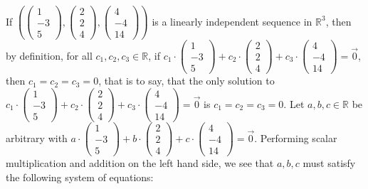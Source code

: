 \documentclass[12pt]{article}
\newenvironment{problem}[2][Problem]
{
	\begin{trivlist} 
		\item[\hskip \labelsep {\bfseries #1 #2:}]
	}
{
	\end{trivlist}
	}
\newenvironment{solution}[1][Solution]
{
	\begin{trivlist} 
		\item[\hskip \labelsep {\itshape #1:}]
	}
	{
	\end{trivlist}
}
\begin{document}
\begin{problem}{1}
\begin{solution}
If $\left(\begin{pmatrix}1\\-3\\5\end{pmatrix}, \begin{pmatrix}2\\2\\4\end{pmatrix}, \begin{pmatrix}4\\-4\\14\end{pmatrix}\right)$ is a linearly independent sequence in $\mathbb{R}^3$, then by definition, for all $c_1,c_2,c_3 \in \mathbb{R}$, if $c_1\cdot\begin{pmatrix}1\\-3\\5\end{pmatrix}+c_2\cdot \begin{pmatrix}2\\2\\4\end{pmatrix}+c_3\cdot\begin{pmatrix}4\\-4\\14\end{pmatrix}=\vec{0}$, then $c_1=c_2=c_3=0$, that is to say, that the only solution to $c_1\cdot\begin{pmatrix}1\\-3\\5\end{pmatrix}+c_2\cdot \begin{pmatrix}2\\2\\4\end{pmatrix}+c_3\cdot\begin{pmatrix}4\\-4\\14\end{pmatrix}=\vec{0}$ is $c_1=c_2=c_3=0$. Let $a,b,c \in \mathbb{R}$ be arbitrary with $a\cdot\begin{pmatrix}1\\-3\\5\end{pmatrix}+b\cdot \begin{pmatrix}2\\2\\4\end{pmatrix}+c\cdot\begin{pmatrix}4\\-4\\14\end{pmatrix}=\vec{0}$. Performing scalar multiplication and addition on the left hand side, we see that $a,b,c$ must satisfy the following system of equations:

\end{solution}
\end{problem}
\end{document}
